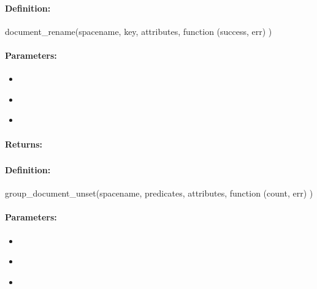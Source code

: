 \paragraph{Definition:}
\begin{javascriptcode}
document_rename(spacename, key, attributes, function (success, err) {})
\end{javascriptcode}
\paragraph{Parameters:}
\begin{itemize}[noitemsep]
\item {}\\

\item {}\\

\item {}\\

\end{itemize}

\paragraph{Returns:}


\pagebreak
\subsubsection{}
\label{api:nodejs:group_document_unset}


\paragraph{Definition:}
\begin{javascriptcode}
group_document_unset(spacename, predicates, attributes, function (count, err) {})
\end{javascriptcode}
\paragraph{Parameters:}
\begin{itemize}[noitemsep]
\item {}\\

\item {}\\

\item {}\\

\end{itemize}

